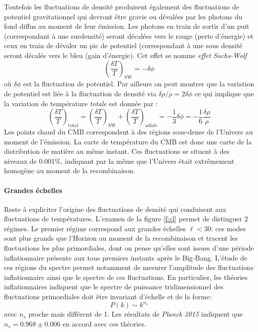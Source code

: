 Toutefois les fluctuations de densité produisent également des fluctuations de potentiel gravitationnel qui devront être gravie ou dévalées par les photons du fond diffus au moment de leur émission. Les photons en train de sortir d'un puit (correspondant à une surdensité) seront décalées vers le rouge (perte d'énergie) et ceux en train de dévaler un pic de potentiel (correspondant à une sous densité seront décalés vers le bleu (gain d'énergie). Cet effet se nomme \textit{effet Sachs-Wolf}
\begin{equation}
\left(\frac{\delta T}{T}\right)_\mathrm{SW}=-\delta\phi
\end{equation}
où $\delta \phi$ est la fluctuation de potentiel. Par ailleurs on peut montrer que la variation de potentiel est liée à la fluctuation de densité via $\delta \rho/\rho=2\delta \phi$ ce qui implique que la variation de température \textit{totale} est donnée par :
\begin{equation}
\left(\frac{\delta T}{T}\right)_\mathrm{total}=\left(\frac{\delta T}{T}\right)_\mathrm{SW}+\left(\frac{\delta T}{T}\right)_\mathrm{adiab}=-\frac{1}{3}\delta \phi=-\frac{1}{6}\frac{\delta \rho}{\rho}
\end{equation}
Les points chaud du CMB correspondent à des régions sous-dense de l'Univers au moment de l'émission. La carte de température du CMB est donc une carte de la distribution de matière au même instant. Ces fluctuations se situent à des niveaux de 0.001\%, indiquant par la même que l'Univers était extrêmement homogène au moment de la recombinaison.

\paragraph{Grandes échelles} Reste à expliciter l'origine des fluctuations de densité qui conduisent aux fluctuations de températures. L'examen de la figure \ref{f:cl} permet de distinguer 2 régimes. Le premier régime correspond aux grandes échelles $\ell<30$: ces modes sont plus grands que l'Horizon au moment de la recombinaison et tracent les fluctuations les plus primordiales, dont on pense qu'elles sont issues d'une période inflationnaire présente aux tous premiers instants après le Big-Bang. L'étude de ces régions du spectre permet notamment de mesurer l'amplitude des fluctuations inflationnaire ainsi que le spectre de ces fluctuations. En particulier, les théories inflationnaires indiquent que le spectre de puissance tridimensionnel des fluctuations primordiales doit être invariant d'échelle et de la forme:
\begin{equation}
P(k)\sim k^{n_s}
\end{equation}
avec $n_s$ proche mais différent de 1. Les résultats de \textit{Planck 2015} indiquent que $n_s=0.968\pm0.006$ en accord avec ces théories.

